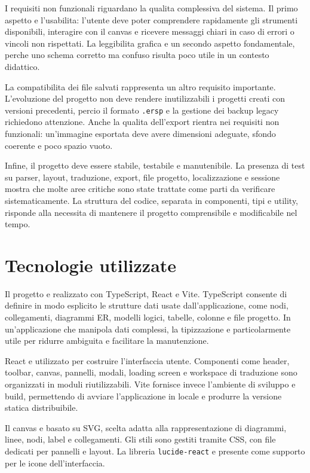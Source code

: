 I requisiti non funzionali riguardano la qualita complessiva del sistema. Il primo aspetto e l'usabilita: l'utente deve poter comprendere rapidamente gli strumenti disponibili, interagire con il canvas e ricevere messaggi chiari in caso di errori o vincoli non rispettati. La leggibilita grafica e un secondo aspetto fondamentale, perche uno schema corretto ma confuso risulta poco utile in un contesto didattico.

La compatibilita dei file salvati rappresenta un altro requisito importante. L'evoluzione del progetto non deve rendere inutilizzabili i progetti creati con versioni precedenti, percio il formato \texttt{.ersp} e la gestione dei backup legacy richiedono attenzione. Anche la qualita dell'export rientra nei requisiti non funzionali: un'immagine esportata deve avere dimensioni adeguate, sfondo coerente e poco spazio vuoto.

Infine, il progetto deve essere stabile, testabile e manutenibile. La presenza di test su parser, layout, traduzione, export, file progetto, localizzazione e sessione mostra che molte aree critiche sono state trattate come parti da verificare sistematicamente. La struttura del codice, separata in componenti, tipi e utility, risponde alla necessita di mantenere il progetto comprensibile e modificabile nel tempo.

\section{Tecnologie utilizzate}

Il progetto e realizzato con TypeScript, React e Vite. TypeScript consente di definire in modo esplicito le strutture dati usate dall'applicazione, come nodi, collegamenti, diagrammi ER, modelli logici, tabelle, colonne e file progetto. In un'applicazione che manipola dati complessi, la tipizzazione e particolarmente utile per ridurre ambiguita e facilitare la manutenzione.

React e utilizzato per costruire l'interfaccia utente. Componenti come header, toolbar, canvas, pannelli, modali, loading screen e workspace di traduzione sono organizzati in moduli riutilizzabili. Vite fornisce invece l'ambiente di sviluppo e build, permettendo di avviare l'applicazione in locale e produrre la versione statica distribuibile.

Il canvas e basato su SVG, scelta adatta alla rappresentazione di diagrammi, linee, nodi, label e collegamenti. Gli stili sono gestiti tramite CSS, con file dedicati per pannelli e layout. La libreria \texttt{lucide-react} e presente come supporto per le icone dell'interfaccia.

